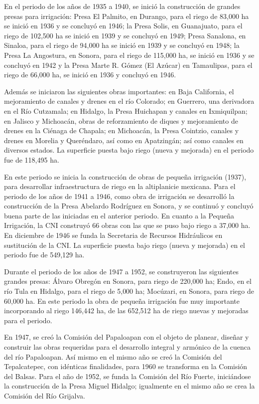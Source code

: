 En el periodo de los años de 1935 a 1940, se inició la construcción de grandes presas para irrigación: Presa El Palmito, en Durango, para el riego de 83,000 ha se inició en 1936 y se concluyó en 1946; la Presa Solis, en Guanajuato, para el riego de 102,500 ha se inició en 1939 y se concluyó en 1949; Presa Sanalona, en Sinaloa, para el riego de 94,000 ha se inició en 1939 y se concluyó en 1948; la Presa La Angostura, en Sonora, para el riego de 115,000 ha, se inició en 1936 y se concluyó en 1942 y la Presa Marte R. Gómez (El Azúcar) en Tamaulipas, para el riego de 66,000 ha, se inició en 1936 y concluyó en 1946.

Además se iniciaron las siguientes obras importantes: en Baja California, el mejoramiento de canales y drenes en el río Colorado; en Guerrero, una derivadora en el Río Cutzamala; en Hidalgo, la Presa Huichapan y canales en Ixmiquilpan; en Jalisco y Michoacán, obras de reforzamiento de diques y mejoramiento de drenes en la Ciénaga de Chapala; en Michoacán, la Presa Cointzio, canales y drenes en Morelia y Queréndaro, así como en Apatzingán; así como canales en diversos estados. La superficie puesta bajo riego (nueva y mejorada) en el periodo fue de 118,495 ha.

En este periodo se inicia la construcción de obras de pequeña irrigación (1937), para desarrollar infraestructura de riego en la altiplanicie mexicana. Para el periodo de los años de 1941 a 1946, como obra de irrigación se desarrolló la construcción de la Presa Abelardo Rodríguez en Sonora, y se continuó y concluyó buena parte de las iniciadas en el anterior periodo. En cuanto a la Pequeña Irrigación, la CNI construyó 66 obras con las que se puso bajo riego a 37,000 ha. En diciembre de 1946 se funda la Secretaria de Recursos Hidráulicos en sustitución de la CNI. La superficie puesta bajo riego (nueva y mejorada) en el periodo fue de 549,129 ha.

Durante el periodo de los años de 1947 a 1952, se construyeron las siguientes grandes presas: Álvaro Obregón en Sonora, para riego de 220,000 ha; Endo, en el río Tula en Hidalgo, para el riego de 5,000 ha; Mocúzari, en Sonora, para riego de 60,000 ha. En este periodo la obra de pequeña irrigación fue muy importante incorporando al riego 146,442 ha, de las 652,512 ha de riego nuevas y mejoradas para el periodo.

En 1947, se creó la Comisión del Papaloapan con el objeto de planear, diseñar y construir las obras requeridas para el desarrollo integral y armónico de la cuenca del río Papaloapan. Así mismo en el mismo año se creó la Comisión del Tepalcatepec, con idénticas finalidades, para 1960 se transforma en la Comisión del Balsas. Para el año de 1952, se funda la Comisión del Río Fuerte, iniciándose la construcción de la Presa Miguel Hidalgo; igualmente en el mismo año se crea la Comisión del Río Grijalva.

